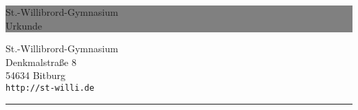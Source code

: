 \documentclass[paper=a4, fontsize=12pt]{article}
\newcommand{\HRule}[1]{\hfill \rule{0.2\linewidth}{#1}}
\begin{document}
\thispagestyle{empty}
\colorbox{grey}{
	\parbox[t]{1.0\linewidth}{
		\centering
		\vspace*{0.7cm}
		\fontsize{20pt}{60pt}\selectfont St.-Willibrord-Gymnasium \\
		\fontsize{40pt}{50pt}\selectfont Urkunde\\
		\fontsize{25pt}{50pt}\selectfont %
		\vspace*{0.7cm}
	}
}
\vfill
{\centering \large 
\hfill St.-Willibrord-Gymnasium \\
\hfill Denkmalstraße 8 \\
\hfill 54634 Bitburg \\
\hfill \texttt{http://st-willi.de} \\

\HRule{1pt}}
\end{document}
